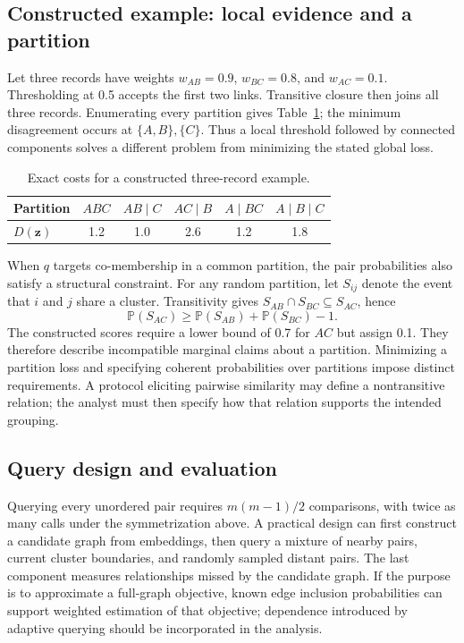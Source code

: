\documentclass[11pt,a4paper]{article}
\newcommand{\Prob}{\mathbb{P}}
\begin{document}
\subsection{Constructed example: local evidence and a partition}

Let three records have weights $w_{AB}=0.9$, $w_{BC}=0.8$, and $w_{AC}=0.1$. Thresholding at 0.5 accepts the first two links. Transitive closure then joins all three records. Enumerating every partition gives Table~\ref{tab:partitions}; the minimum disagreement occurs at $\{A,B\},\{C\}$. Thus a local threshold followed by connected components solves a different problem from minimizing the stated global loss.

\begin{table}[!htbp]
\centering\small
\caption{Exact costs for a constructed three-record example.}\label{tab:partitions}
\begin{tabular}{@{}lccccc@{}}
\toprule
Partition & $ABC$ & $AB\mid C$ & $AC\mid B$ & $A\mid BC$ & $A\mid B\mid C$ \\
\midrule
$D(\boldsymbol z)$ & 1.2 & 1.0 & 2.6 & 1.2 & 1.8 \\
\bottomrule
\end{tabular}
\end{table}

When $q$ targets co-membership in a common partition, the pair probabilities also satisfy a structural constraint. For any random partition, let $S_{ij}$ denote the event that $i$ and $j$ share a cluster. Transitivity gives $S_{AB}\cap S_{BC}\subseteq S_{AC}$, hence
\begin{equation}
 \Prob(S_{AC})\geq \Prob(S_{AB})+\Prob(S_{BC})-1.
 \label{eq:partition-coherence}
\end{equation}
The constructed scores require a lower bound of 0.7 for $AC$ but assign 0.1. They therefore describe incompatible marginal claims about a partition. Minimizing a partition loss and specifying coherent probabilities over partitions impose distinct requirements. A protocol eliciting pairwise similarity may define a nontransitive relation; the analyst must then specify how that relation supports the intended grouping.

\subsection{Query design and evaluation}

Querying every unordered pair requires $m(m-1)/2$ comparisons, with twice as many calls under the symmetrization above. A practical design can first construct a candidate graph from embeddings, then query a mixture of nearby pairs, current cluster boundaries, and randomly sampled distant pairs. The last component measures relationships missed by the candidate graph. If the purpose is to approximate a full-graph objective, known edge inclusion probabilities can support weighted estimation of that objective; dependence introduced by adaptive querying should be incorporated in the analysis.
\end{document}
